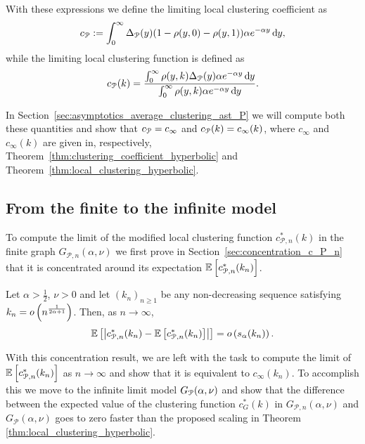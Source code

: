 With these expressions we define the limiting local clustering coefficient as
\begin{equation}\label{eq:def_average_clustering_infinite_model}
	c_{{\mathcal P}} := \int_0^\infty \Delta_{{\mathcal P}}(y) (1 - \rho(y,0) - \rho(y,1)) \alpha e^{-\alpha y} \operatorname{\mathrm{d}\hspace{-2pt}} y,
\end{equation}
while the limiting local clustering function is defined as
\begin{equation}\label{eq:def_c_infty_k}
	c_{{\mathcal P}}(k) = \frac{\int_0^\infty \rho(y,k) \Delta_{{\mathcal P}}(y) \alpha e^{-\alpha y} \operatorname{\mathrm{d}\hspace{-2pt}} y}{\int_0^\infty \rho(y,k) \alpha e^{-\alpha y} \operatorname{\mathrm{d}\hspace{-2pt}} y}.
\end{equation}

In Section~\ref{sec:asymptotics_average_clustering_ast_P} we will compute both these quantities and show that $c_{{\mathcal P}} = c_\infty$ and $c_{{\mathcal P}}(k) = c_\infty(k)$, where $c_\infty$ and $c_\infty(k)$ are given in, respectively, Theorem~\ref{thm:clustering_coefficient_hyperbolic} and Theorem~\ref{thm:local_clustering_hyperbolic}.

\subsection{From the finite to the infinite model}

To compute the limit of the modified local clustering function $c_{\mathcal{P},n}^\ast(k)$ in the finite graph $G_{\mathcal{P},n}(\alpha, \nu)$ we first prove in Section~\ref{sec:concentration_c_P_n} that it is concentrated around its expectation $\mathbb{E}\left[c_{\mathcal{P},n}^\ast(k_n)\right]$.

\begin{proposition}\label{prop:concentration_local_clustering_P_n}
Let $\alpha > \frac{1}{2}$, $\nu > 0$ and let $(k_n)_{n \ge 1}$ be any non-decreasing sequence satisfying $k_n = o\left(n^{\frac{1}{2\alpha+1}}\right)$. Then, as $n \to \infty$,
\[
	\mathbb{E}\left[\left|c_{\mathcal{P},n}^\ast(k_n) - \mathbb{E}\left[c_{\mathcal{P},n}^\ast(k_n)\right]\right|\right] = o\left(s_\alpha(k_n)\right).
\]
\end{proposition}

With this concentration result, we are left with the task to compute the limit of $\mathbb{E}\left[c_{\mathcal{P},n}^\ast(k_n)\right]$ as $n \to \infty$ and show that it is equivalent to $c_\infty(k_n)$. To accomplish this we move to the infinite limit model $G_{{\mathcal P}}(\alpha,\nu)$ and show that the difference between the expected value of the clustering function $c_G^\ast(k)$ in $G_{\mathcal{P},n}(\alpha,\nu)$ and $G_{\mathcal{P}}(\alpha,\nu)$ goes to zero faster than the proposed scaling in Theorem \ref{thm:local_clustering_hyperbolic}.


